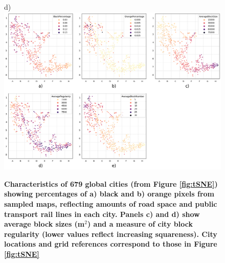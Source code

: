 \documentclass[preprint,10pt]{elsarticle} %
\begin{document}
\begin{figure}
\scriptsize{d)} \includegraphics[trim={ 7 30 703 380 },clip,scale=0.40]{Images/City_Types_Dimension_chessboard.png}
\caption{\bf Characteristics of 679 global cities (from Figure \ref{fig:tSNE}) showing percentages\cite{Thompson2020} of a) black and b) orange pixels from sampled maps, reflecting amounts of road space and public transport rail lines in each city. Panels c) and d) show\cite{Nice2019b} average block sizes (m$^{2}$) and a measure of city block regularity (lower values reflect increasing squareness). City locations and grid references correspond to those in Figure \ref{fig:tSNE}}
 \label{fig:Dimensions}
\end{figure}
\end{document}
